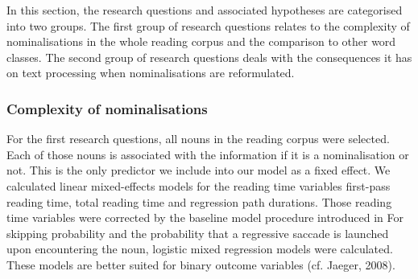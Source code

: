 \documentclass[output=paper]{langsci/langscibook}
\begin{document}
In this section, the research questions and associated hypotheses are categorised into two groups. The first group of research questions relates to the complexity of nominalisations in the whole reading corpus and the comparison to other word classes. The second group of research questions deals with the consequences it has on text processing when nominalisations are reformulated. 

\subsubsection{Complexity of nominalisations}

For the first research questions, all nouns in the reading corpus were selected. Each of those nouns is associated with the information if it is a nominalisation or not. This is the only predictor we include into our model as a fixed effect. We calculated linear mixed-effects models for the reading time variables first-pass reading time, total reading time and regression path durations. Those reading time variables were corrected by the baseline model procedure introduced in  For skipping probability and the probability that a regressive saccade is launched upon encountering the noun, logistic mixed regression models were calculated. These models are better suited for binary outcome variables (cf. Jaeger, 2008).
\end{document}
